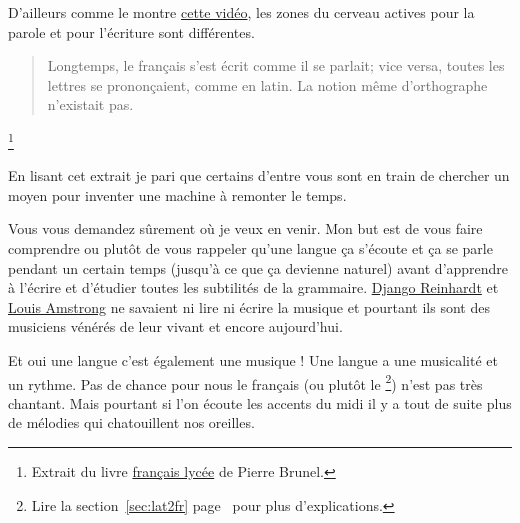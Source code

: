 D'ailleurs comme le montre \href{https://youtu.be/Wn\_eBrIDUuc}{cette vidéo}, les zones du cerveau actives
pour la parole et pour l'écriture sont différentes.\par

\begin{quote}
Longtemps, le français s'est écrit comme il se parlait; vice versa,
toutes les lettres se prononçaient, comme en latin. La notion même
d'orthographe n'existait pas.
\end{quote}\footnote{Extrait du livre
\href{https://www.amazon.fr/gp/product/2844100015/ref=as\_li\_tl?ie=UTF8\&camp=1642\&creative=6746\&creativeASIN=2844100015\&linkCode=as2\&tag=wwwbecomefree-21\&linkId=985f3a849fd44728e8480993cf2d5490}{français
  lycée} de Pierre Brunel.}


En lisant cet extrait je pari que certains d'entre vous sont en train
de chercher un moyen pour inventer une machine à remonter le temps. 

Vous vous demandez sûrement où je veux en venir. Mon but est de vous
faire comprendre ou plutôt de vous rappeler qu'une langue ça s'écoute
et ça se parle pendant un certain temps (jusqu'à ce que ça devienne
naturel) avant d'apprendre à l'écrire et d'étudier toutes les
subtilités de la grammaire. \href{https://fr.wikipedia.org/wiki/Django\_Reinhardt}{Django Reinhardt} et \href{https://fr.wikipedia.org/wiki/Louis\_Armstrong}{Louis Amstrong} ne
savaient ni lire ni écrire la musique et pourtant ils sont des
musiciens vénérés de leur vivant et encore aujourd'hui.\par

Et oui une langue c'est également une musique ! Une langue a une
musicalité et un rythme. Pas de chance pour nous le français (ou
plutôt le \footnote{Lire la section~\ref{sec:lat2fr}
  page~\pageref{sec:lat2fr} pour plus d'explications.})
n'est pas très chantant. Mais pourtant si l'on écoute les accents du
midi il y a tout de suite plus de mélodies qui chatouillent nos
oreilles. 

